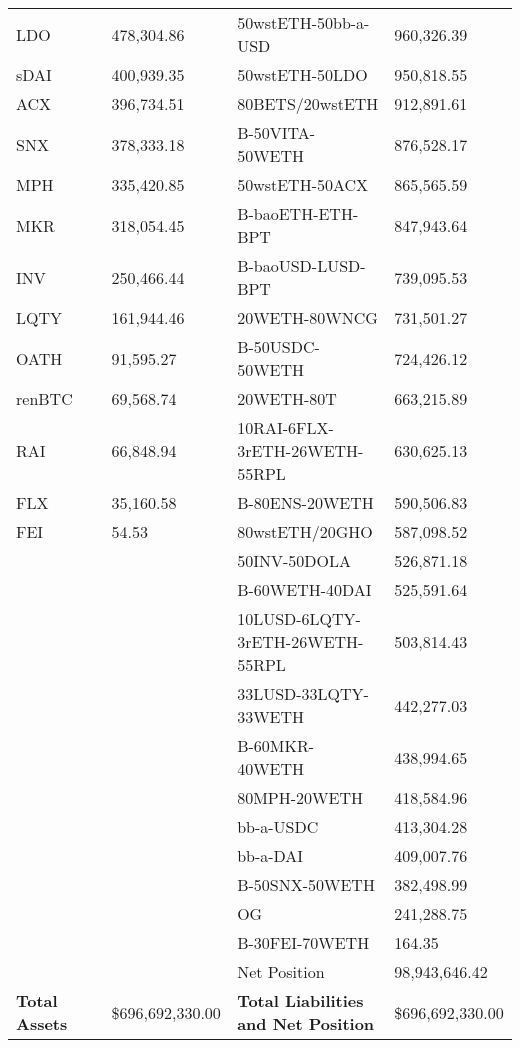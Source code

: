 \begin{longtable}{@{}p{0.25\linewidth}p{0.25\linewidth}p{0.25\linewidth}p{0.25\linewidth}@{}}
LDO & 478,304.86 & 50wstETH-50bb-a-USD & 960,326.39 \\
sDAI & 400,939.35 & 50wstETH-50LDO & 950,818.55 \\
ACX & 396,734.51 & 80BETS/20wstETH & 912,891.61 \\
SNX & 378,333.18 & B-50VITA-50WETH & 876,528.17 \\
MPH & 335,420.85 & 50wstETH-50ACX & 865,565.59 \\
MKR & 318,054.45 & B-baoETH-ETH-BPT & 847,943.64 \\
INV & 250,466.44 & B-baoUSD-LUSD-BPT & 739,095.53 \\
LQTY & 161,944.46 & 20WETH-80WNCG & 731,501.27 \\
OATH & 91,595.27 & B-50USDC-50WETH & 724,426.12 \\
renBTC & 69,568.74 & 20WETH-80T & 663,215.89 \\
RAI & 66,848.94 & 10RAI-6FLX-3rETH-26WETH-55RPL & 630,625.13 \\
FLX & 35,160.58 & B-80ENS-20WETH & 590,506.83 \\
FEI & 54.53 & 80wstETH/20GHO & 587,098.52 \\
 &  & 50INV-50DOLA & 526,871.18 \\
 &  & B-60WETH-40DAI & 525,591.64 \\
 &  & 10LUSD-6LQTY-3rETH-26WETH-55RPL & 503,814.43 \\
 &  & 33LUSD-33LQTY-33WETH & 442,277.03 \\
 &  & B-60MKR-40WETH & 438,994.65 \\
 &  & 80MPH-20WETH & 418,584.96 \\
 &  & bb-a-USDC & 413,304.28 \\
 &  & bb-a-DAI & 409,007.76 \\
 &  & B-50SNX-50WETH & 382,498.99 \\
 &  & OG & 241,288.75 \\
 &  & B-30FEI-70WETH & 164.35 \\
 &  & Net Position & 98,943,646.42 \\

\midrule

\textbf{Total Assets} & \$696,692,330.00 & \textbf{Total Liabilities and Net Position} & \$696,692,330.00 \\

\bottomrule

\end{longtable}
